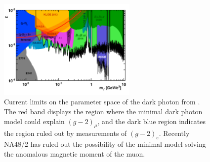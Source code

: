 \begin{figure}[h]
    \centering
    \includegraphics[width = 0.6\textwidth]{Figures/limits/darkphoton_limits}
    \caption[Current limits on the parameter space of the dark photon.]{Current limits on the parameter space of the dark photon from \cite{Soffer:2015kpa}. The red band displays the region where the minimal dark photon model could explain $(g-2)_\mu$, and the dark blue region indicates the region ruled out by measurements of $(g-2)_e$. Recently NA48/2 has ruled out the possibility of the minimal model solving the anomalous magnetic moment of the muon.}
    \label{fig:darkphoton_limits}
\end{figure}

